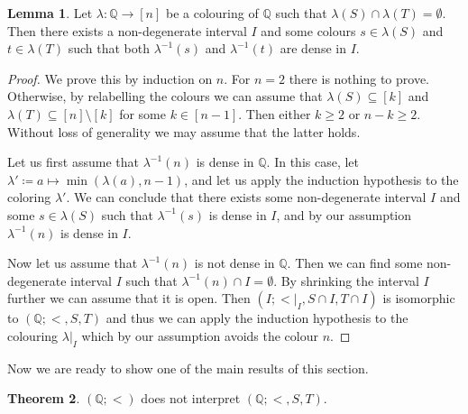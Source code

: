 \documentclass{amsart}
\theoremstyle{definition}
\newtheorem{theorem}{Theorem}[section]
\newtheorem{lemma}[theorem]{Lemma}
\theoremstyle{remark}
\numberwithin{equation}{section}
\begin{document}
\begin{lemma}\label{colours}
	Let $\lambda \colon \mathbb{Q}\rightarrow [n]$ be a colouring of $\mathbb{Q}$ such that $\lambda(S)\cap \lambda(T)=\emptyset$. Then there exists a non-degenerate interval $I$ and some colours $s\in \lambda(S)$ and $t\in \lambda(T)$ such that both $\lambda^{-1}(s)$ and $\lambda^{-1}(t)$ are dense in $I$.
\end{lemma}

\begin{proof}
	We prove this by induction on $n$. For $n=2$ there is nothing to prove. Otherwise, by relabelling the colours we can assume that $\lambda(S)\subseteq [k]$ and $\lambda(T)\subseteq [n]\setminus [k]$ for some $k\in [n-1]$. Then either $k\geq 2$ or $n-k\geq 2$. Without loss of generality we may assume that the latter holds. 
	
	Let us first assume that $\lambda^{-1}(n)$ is dense in $\mathbb{Q}$. In this case, let $\lambda'\coloneqq a\mapsto \min(\lambda(a),n-1)$, and let us apply the induction hypothesis to the coloring $\lambda'$. We can conclude that there exists some non-degenerate interval $I$ and some $s\in {\lambda(S)}$ such that $\lambda^{-1}(s)$ is dense in $I$, and by our assumption $\lambda^{-1}(n)$ is dense in $I$.
	
	Now let us assume that $\lambda^{-1}(n)$ is not dense in $\mathbb{Q}$.
Then we can find some non-degenerate interval $I$ such that $\lambda^{-1}(n)\cap I=\emptyset$. By shrinking the interval $I$ further we can assume that it is open.
Then $(I;{<}|_I,S \cap I,T \cap I)$ is isomorphic to $(\mathbb{Q};<,S,T)$ and thus we can apply the induction hypothesis to the colouring $\lambda|_I$ which by our assumption avoids the colour $n$.
\end{proof}

	Now we are ready to show one of the main results of this section.

\begin{theorem}\label{not_interpretable_part}
	$(\mathbb{Q};<)$ does not interpret $(\mathbb{Q};<,S,T)$.
\end{theorem}
\end{document}
